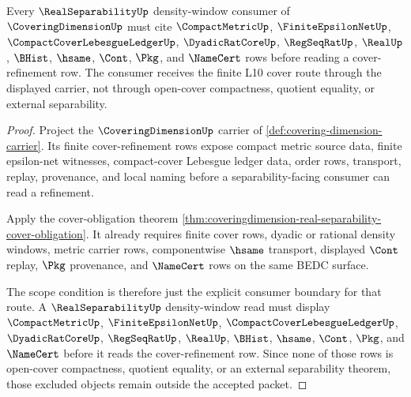 \begin{theorem}
\label{thm:coveringdimension-real-separability-cover-obligation-scope}
Every $\RealSeparabilityUp$ density-window consumer of $\CoveringDimensionUp$ must cite $\CompactMetricUp$, $\FiniteEpsilonNetUp$, $\CompactCoverLebesgueLedgerUp$, $\DyadicRatCoreUp$, $\RegSeqRatUp$, $\RealUp$, $\BHist$, $\hsame$, $\Cont$, $\Pkg$, and $\NameCert$ rows before reading a cover-refinement row. The consumer receives the finite L10 cover route through the displayed carrier, not through open-cover compactness, quotient equality, or external separability.
\end{theorem}
\begin{proof}
Project the $\CoveringDimensionUp$ carrier of \autoref{def:covering-dimension-carrier}. Its finite cover-refinement rows expose compact metric source data, finite epsilon-net witnesses, compact-cover Lebesgue ledger data, order rows, transport, replay, provenance, and local naming before a separability-facing consumer can read a refinement.

Apply the cover-obligation theorem \autoref{thm:coveringdimension-real-separability-cover-obligation}. It already requires finite cover rows, dyadic or rational density windows, metric carrier rows, componentwise $\hsame$ transport, displayed $\Cont$ replay, $\Pkg$ provenance, and $\NameCert$ rows on the same BEDC surface.

The scope condition is therefore just the explicit consumer boundary for that route. A $\RealSeparabilityUp$ density-window read must display $\CompactMetricUp$, $\FiniteEpsilonNetUp$, $\CompactCoverLebesgueLedgerUp$, $\DyadicRatCoreUp$, $\RegSeqRatUp$, $\RealUp$, $\BHist$, $\hsame$, $\Cont$, $\Pkg$, and $\NameCert$ before it reads the cover-refinement row. Since none of those rows is open-cover compactness, quotient equality, or an external separability theorem, those excluded objects remain outside the accepted packet.
\end{proof}

